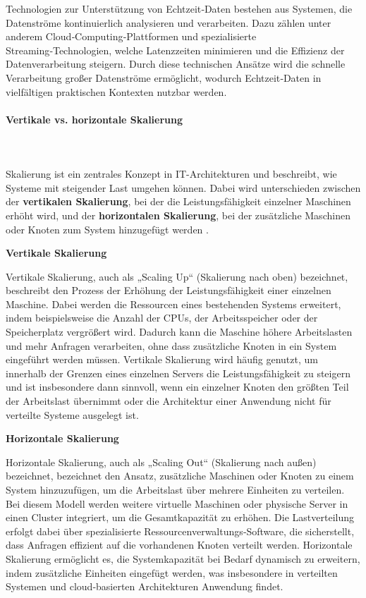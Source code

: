 Technologien zur Unterstützung von Echtzeit‑Daten bestehen aus Systemen, die Datenströme kontinuierlich analysieren und verarbeiten. Dazu zählen unter anderem Cloud‑Computing‑Plattformen und spezialisierte Streaming‑Technologien, welche Latenzzeiten minimieren und die Effizienz der Datenverarbeitung steigern. Durch diese technischen Ansätze wird die schnelle Verarbeitung großer Datenströme ermöglicht, wodurch Echtzeit‑Daten in vielfältigen praktischen Kontexten nutzbar werden.

\paragraph{Vertikale vs. horizontale Skalierung}
\mbox{}\\
\mbox{}\\
Skalierung ist ein zentrales Konzept in IT-Architekturen und beschreibt, wie Systeme mit steigender Last umgehen können. Dabei wird unterschieden zwischen der \textbf{vertikalen Skalierung}, bei der die Leistungsfähigkeit einzelner Maschinen erhöht wird, und der \textbf{horizontalen Skalierung}, bei der zusätzliche Maschinen oder Knoten zum System hinzugefügt werden \cite{akamai_scaling}.

\textbf{Vertikale Skalierung}

Vertikale Skalierung, auch als „Scaling Up“ (Skalierung nach oben) bezeichnet, beschreibt den Prozess der Erhöhung der Leistungsfähigkeit einer einzelnen Maschine. Dabei werden die Ressourcen eines bestehenden Systems erweitert, indem beispielsweise die Anzahl der CPUs, der Arbeitsspeicher oder der Speicherplatz vergrößert wird. Dadurch kann die Maschine höhere Arbeitslasten und mehr Anfragen verarbeiten, ohne dass zusätzliche Knoten in ein System eingeführt werden müssen. Vertikale Skalierung wird häufig genutzt, um innerhalb der Grenzen eines einzelnen Servers die Leistungsfähigkeit zu steigern und ist insbesondere dann sinnvoll, wenn ein einzelner Knoten den größten Teil der Arbeitslast übernimmt oder die Architektur einer Anwendung nicht für verteilte Systeme ausgelegt ist.\cite{akamai_scaling}

\textbf{Horizontale Skalierung}

Horizontale Skalierung, auch als „Scaling Out“ (Skalierung nach außen) bezeichnet, bezeichnet den Ansatz, zusätzliche Maschinen oder Knoten zu einem System hinzuzufügen, um die Arbeitslast über mehrere Einheiten zu verteilen. Bei diesem Modell werden weitere virtuelle Maschinen oder physische Server in einen Cluster integriert, um die Gesamtkapazität zu erhöhen. Die Lastverteilung erfolgt dabei über spezialisierte Ressourcenverwaltungs‑Software, die sicherstellt, dass Anfragen effizient auf die vorhandenen Knoten verteilt werden. Horizontale Skalierung ermöglicht es, die Systemkapazität bei Bedarf dynamisch zu erweitern, indem zusätzliche Einheiten eingefügt werden, was insbesondere in verteilten Systemen und cloud‑basierten Architekturen Anwendung findet.\cite{akamai_scaling}

